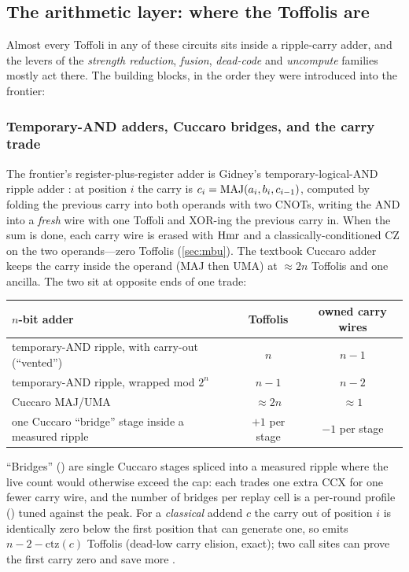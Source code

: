 \subsection{The arithmetic layer: where the Toffolis are}\label{sec:arith}

Almost every Toffoli in any of these circuits sits inside a ripple-carry adder, and the levers of the \emph{strength reduction}, \emph{fusion}, \emph{dead-code} and \emph{uncompute} families mostly act there. The building blocks, in the order they were introduced into the frontier:

\subsubsection{Temporary-AND adders, Cuccaro bridges, and the carry trade}\label{sec:adders}

The frontier's register-plus-register adder is Gidney's temporary-logical-AND ripple adder \cite{gidney18add}: at position $i$ the carry is $c_{i}=\mathrm{MAJ}(a_i,b_i,c_{i-1})$, computed by folding the previous carry into both operands with two CNOTs, writing the AND into a \emph{fresh} wire with one Toffoli and XOR-ing the previous carry in. When the sum is done, each carry wire is erased with $\mathrm{Hmr}$ and a classically-conditioned CZ on the two operands---zero Toffolis (\cref{sec:mbu}). The textbook Cuccaro adder \cite{cuccaro04} keeps the carry inside the operand (MAJ then UMA) at $\approx2n$ Toffolis and one ancilla. The two sit at opposite ends of one trade:
\begin{center}\small
\begin{tabular}{@{}lcc@{}}
\toprule
$n$-bit adder & Toffolis & owned carry wires\\
\midrule
temporary-AND ripple, with carry-out (``vented'') & $n$ & $n-1$\\
temporary-AND ripple, wrapped mod $2^n$ & $n-1$ & $n-2$\\
Cuccaro MAJ/UMA & $\approx2n$ & $\approx1$\\
one Cuccaro ``bridge'' stage inside a measured ripple & $+1$ per stage & $-1$ per stage\\
\bottomrule
\end{tabular}
\end{center}
``Bridges'' () are single Cuccaro stages spliced into a measured ripple where the live count would otherwise exceed the cap: each trades one extra CCX for one fewer carry wire, and the number of bridges per replay cell is a per-round profile () tuned against the peak. For a \emph{classical} addend $c$ the carry out of position $i$ is identically zero below the first position that can generate one, so  emits $n-2-\mathrm{ctz}(c)$ Toffolis (dead-low carry elision, exact); two call sites can prove the first carry zero and save more \cite{ecdsafail-wiki}.

